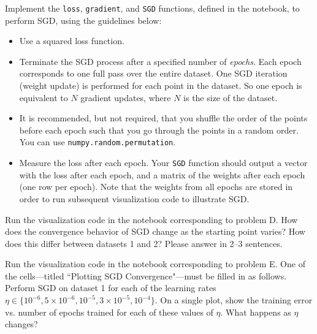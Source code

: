 \begin{problem}[8]
Implement the \texttt{loss}, \texttt{gradient}, and \texttt{SGD} functions, defined in the notebook, to perform SGD, using the guidelines below:

\begin{itemize}
	\item Use a squared loss function.
	\item Terminate the SGD process after a specified number of \emph{epochs}.
	      Each epoch corresponds to one full pass over the entire dataset.
	      One SGD iteration (weight update) is performed for each point in the dataset.
	      So one epoch is equivalent to $N$ gradient updates, where $N$ is the size of the dataset.
	\item It is recommended, but not required, that you shuffle the order of the points before each epoch such that you go through the points in a random order.
	      You can use \texttt{numpy.random.permutation}.
	\item Measure the loss after each epoch.
	      Your \texttt{SGD} function should output a vector with the loss after each epoch, and a matrix of the weights after each epoch (one row per epoch).
	      Note that the weights from all epochs are stored in order to run subsequent visualization code to illustrate SGD.
\end{itemize}
\end{problem}
\begin{solution}

\end{solution}

\begin{problem}[2]
Run the visualization code in the notebook corresponding to problem D.
How does the convergence behavior of SGD change as the starting point varies?
How does this differ between datasets 1 and 2?
Please answer in 2--3 sentences.
\end{problem}
\begin{solution}

\end{solution}

\begin{problem}[6]
Run the visualization code in the notebook corresponding to problem E.
One of the cells---titled ``Plotting SGD Convergence"---must be filled in as follows.
Perform SGD on dataset 1 for each of the learning rates $\eta \in \{10^{-6}, 5\times10^{-6}, 10^{-5}, 3\times 10^{-5}, 10^{-4}\}$.
On a single plot, show the training error vs. number of epochs trained for each of these values of $\eta$.
What happens as $\eta$ changes?
\end{problem}

